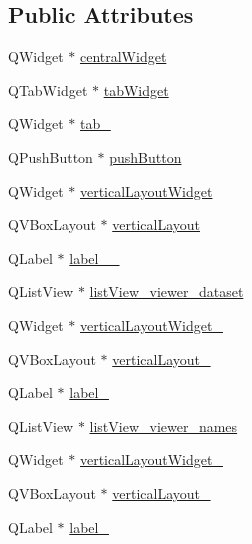 \subsection*{Public Attributes}
\begin{DoxyCompactItemize}
\item 
Q\+Widget $\ast$ \hyperlink{class_ui___main_window_a30075506c2116c3ed4ff25e07ae75f81}{central\+Widget}
\item 
Q\+Tab\+Widget $\ast$ \hyperlink{class_ui___main_window_a3260b943854b841c986f47c4726ee7f9}{tab\+Widget}
\item 
Q\+Widget $\ast$ \hyperlink{class_ui___main_window_aaec62cc5ca431a2130984a6a290259e0}{tab\+\_}
\item 
Q\+Push\+Button $\ast$ \hyperlink{class_ui___main_window_ad332d93084584930878f1daf5f84cdbf}{push\+Button}
\item 
Q\+Widget $\ast$ \hyperlink{class_ui___main_window_a805d415fff07a22a85219e1f22f2da28}{vertical\+Layout\+Widget}
\item 
Q\+V\+Box\+Layout $\ast$ \hyperlink{class_ui___main_window_aecd96a04789fcfec3f98d80390ad8184}{vertical\+Layout}
\item 
Q\+Label $\ast$ \hyperlink{class_ui___main_window_acd26cf13382830994735774995b9e6d4}{label\+\_\+\_\+}
\item 
Q\+List\+View $\ast$ \hyperlink{class_ui___main_window_aa685d9d2d4e60e53c288ecf32647f35a}{list\+View\+\_\+viewer\+\_\+dataset}
\item 
Q\+Widget $\ast$ \hyperlink{class_ui___main_window_a62b94f49d79e473da0f96d804b9c3af7}{vertical\+Layout\+Widget\+\_}
\item 
Q\+V\+Box\+Layout $\ast$ \hyperlink{class_ui___main_window_a0c01bad60d9f422a1258e710635a2f65}{vertical\+Layout\+\_}
\item 
Q\+Label $\ast$ \hyperlink{class_ui___main_window_ac6c19d112b25073d9276c377d00dbadb}{label\+\_}
\item 
Q\+List\+View $\ast$ \hyperlink{class_ui___main_window_af4947b2cf47f37208aebd8ba38db853a}{list\+View\+\_\+viewer\+\_\+names}
\item 
Q\+Widget $\ast$ \hyperlink{class_ui___main_window_acfaf6d66c957965550714c6b9bd0edc0}{vertical\+Layout\+Widget\+\_}
\item 
Q\+V\+Box\+Layout $\ast$ \hyperlink{class_ui___main_window_a38b8a4b887f3b58e2a49e7905ae6f1f0}{vertical\+Layout\+\_}
\item 
Q\+Label $\ast$ \hyperlink{class_ui___main_window_a40eea22fe5c81f370b7464d2e962fe8d}{label\+\_}

\end{DoxyCompactItemize}
